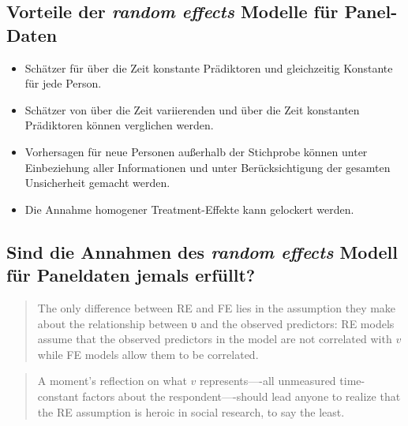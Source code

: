 \documentclass[
]{book}
\providecommand{\tightlist}{%
  \setlength{\itemsep}{0pt}\setlength{\parskip}{0pt}}
\begin{document}
\hypertarget{vorteile-der-random-effects-modelle-fuxfcr-panel-daten}{%
\subsection*{\texorpdfstring{Vorteile der \emph{random effects} Modelle für Panel-Daten}{Vorteile der random effects Modelle für Panel-Daten}}\label{vorteile-der-random-effects-modelle-fuxfcr-panel-daten}}

\begin{itemize}
\tightlist
\item
  Schätzer für über die Zeit konstante Prädiktoren und gleichzeitig Konstante für jede Person.
\item
  Schätzer von über die Zeit variierenden und über die Zeit konstanten Prädiktoren können verglichen werden.
\item
  Vorhersagen für neue Personen außerhalb der Stichprobe können unter Einbeziehung aller Informationen und unter Berücksichtigung der gesamten Unsicherheit gemacht werden.
\item
  Die Annahme homogener Treatment-Effekte kann gelockert werden.
\end{itemize}

\hypertarget{sind-die-annahmen-des-random-effects-modell-fuxfcr-paneldaten-jemals-erfuxfcllt}{%
\subsection*{\texorpdfstring{Sind die Annahmen des \emph{random effects} Modell für Paneldaten jemals erfüllt?}{Sind die Annahmen des random effects Modell für Paneldaten jemals erfüllt?}}\label{sind-die-annahmen-des-random-effects-modell-fuxfcr-paneldaten-jemals-erfuxfcllt}}

\begin{quote}
The only difference between RE and FE lies in the assumption they make about the relationship between υ and the observed predictors: RE models assume that the observed predictors in the model are not correlated with \(v\) while FE models allow them to be correlated.
\end{quote}

\begin{quote}
A moment's reflection on what \(v\) represents----all unmeasured time-constant factors about the respondent----should lead anyone to realize that the RE assumption is heroic in social research, to say the least.
\end{quote}
\end{document}
